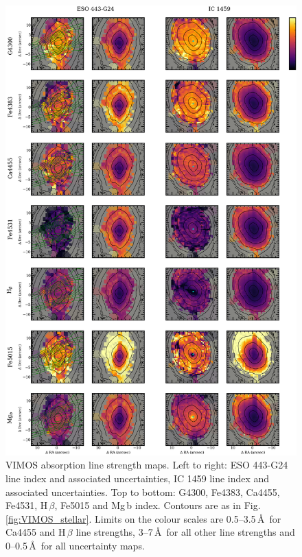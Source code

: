 		\begin{figure}
			\centering
			\includegraphics[height=0.89\textheight]{chapter4/vimos/abs1.png}
			\caption[VIMOS absorption line strength maps]{VIMOS absorption line strength maps. Left to right: ESO 443-G24 line index and associated uncertainties, IC 1459 line index and associated uncertainties. Top to bottom: G4300, Fe4383, Ca4455, Fe4531, H\,$\beta$, Fe5015 and Mg\,b index. Contours are as in Fig.\,\ref{fig:VIMOS_stellar}. Limits on the colour scales are 0.5--3.5\,\AA\ for Ca4455 and H\,$\beta$ line strengths, 3--7\,\AA\ for all other line strengths and 0--0.5\,\AA\ for all uncertainty maps.}
			\label{fig:VIMOS_absorption}
		\end{figure}
